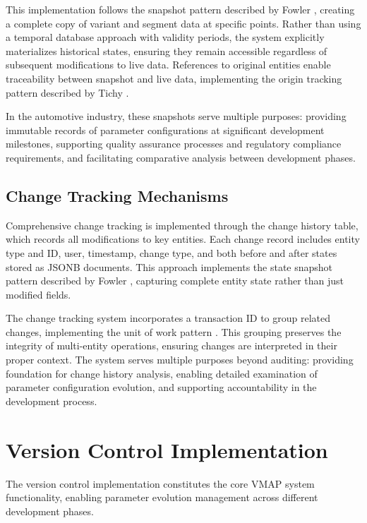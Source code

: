 This implementation follows the snapshot pattern described by Fowler \cite{fowler2003patterns}, creating a complete copy of variant and segment data at specific points. Rather than using a temporal database approach with validity periods, the system explicitly materializes historical states, ensuring they remain accessible regardless of subsequent modifications to live data. References to original entities enable traceability between snapshot and live data, implementing the origin tracking pattern described by Tichy \cite{tichy1985rcs}.

In the automotive industry, these snapshots serve multiple purposes: providing immutable records of parameter configurations at significant development milestones, supporting quality assurance processes and regulatory compliance requirements, and facilitating comparative analysis between development phases.

\subsection{Change Tracking Mechanisms}
\label{subsec:change-tracking-mechanisms}

Comprehensive change tracking is implemented through the change history table, which records all modifications to key entities. Each change record includes entity type and ID, user, timestamp, change type, and both before and after states stored as JSONB documents. This approach implements the state snapshot pattern described by Fowler \cite{fowler2003patterns}, capturing complete entity state rather than just modified fields.

The change tracking system incorporates a transaction ID to group related changes, implementing the unit of work pattern \cite{fowler2003patterns}. This grouping preserves the integrity of multi-entity operations, ensuring changes are interpreted in their proper context. The system serves multiple purposes beyond auditing: providing foundation for change history analysis, enabling detailed examination of parameter configuration evolution, and supporting accountability in the development process.

\section{Version Control Implementation}
\label{sec:version-control-implementation}

The version control implementation constitutes the core VMAP system functionality, enabling parameter evolution management across different development phases.

